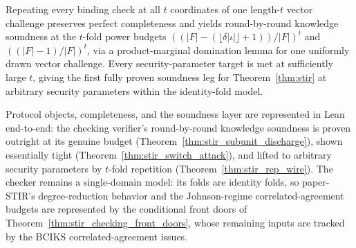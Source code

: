 \begin{theorem}\label{thm:stir_rep_wire}
    Repeating every binding check at all $t$ coordinates of one length-$t$ vector challenge
    preserves perfect completeness and yields round-by-round knowledge soundness at the
    $t$-fold power budgets $((|F|-(\lfloor\delta|\iota|\rfloor+1))/|F|)^t$ and
    $((|F|-1)/|F|)^t$, via a product-marginal domination lemma for one uniformly drawn
    vector challenge.  Every security-parameter target is met at sufficiently large $t$,
    giving the first fully proven soundness leg for Theorem~\ref{thm:stir} at arbitrary
    security parameters within the identity-fold model.
\end{theorem}

\begin{remark}\label{rem:stir_status}
    Protocol objects, completeness, and the soundness layer are represented in Lean
    end-to-end: the checking verifier's round-by-round knowledge soundness is proven
    outright at its genuine budget (Theorem~\ref{thm:stir_subunit_discharge}), shown
    essentially tight (Theorem~\ref{thm:stir_switch_attack}), and lifted to arbitrary
    security parameters by $t$-fold repetition (Theorem~\ref{thm:stir_rep_wire}).  The
    checker remains a single-domain model: its folds are identity folds, so paper-STIR's
    degree-reduction behavior and the Johnson-regime correlated-agreement budgets are
    represented by the conditional front doors of
    Theorem~\ref{thm:stir_checking_front_doors}, whose remaining inputs are tracked by the
    BCIKS correlated-agreement issues.
\end{remark}
